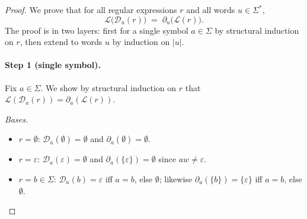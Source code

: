 \begin{proof}[Proof]
We prove that for all regular expressions $r$ and all words $u \in \Sigma^*$,
\[
  \mathcal{L}\!\big(\mathcal{D}_u(r)\big) \;=\; \partial_u\!\big(\mathcal{L}(r)\big).
\]
The proof is in two layers: first for a single symbol $a\in\Sigma$ by structural
induction on $r$, then extend to words $u$ by induction on $|u|$.

\paragraph{Step 1 (single symbol).}
Fix $a\in\Sigma$. We show by structural induction on $r$ that
$\mathcal{L}(\mathcal{D}_a(r))=\partial_a(\mathcal{L}(r))$.

\smallskip
\noindent\emph{Bases.}
\begin{itemize}
  \item $r=\emptyset$: $\mathcal{D}_a(\emptyset)=\emptyset$ and $\partial_a(\emptyset)=\emptyset$.
  \item $r=\varepsilon$: $\mathcal{D}_a(\varepsilon)=\emptyset$ and
        $\partial_a(\{\varepsilon\})=\emptyset$ since $aw\neq\varepsilon$.
  \item $r=b\in\Sigma$:
        $\mathcal{D}_a(b)=\varepsilon$ iff $a=b$, else $\emptyset$;
        likewise $\partial_a(\{b\})=\{\varepsilon\}$ iff $a=b$, else $\emptyset$.
\end{itemize}


\end{proof}
